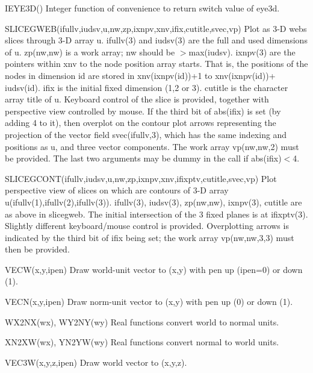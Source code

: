 IEYE3D() Integer function of convenience to return switch value of eye3d.



\iftth {}\fi


SLICEGWEB(ifullv,iudsv,u,nw,zp,ixnpv,xnv,ifix,cutitle,svec,vp) Plot
as 3-D webs slices through 3-D array u. ifullv(3) and iudsv(3) are the
full and used dimensions of u. zp(nw,nw) is a work array; nw should be
$>$max(iudsv). ixnpv(3) are the pointers within xnv to the node
position array starts. That is, the positions of the nodes in
dimension id are stored in xnv(ixnpv(id))+1 to xnv(ixnpv(id))+
iudsv(id). ifix is the initial fixed dimension (1,2 or 3). cutitle is
the character array title of u. Keyboard control of the slice is
provided, together with perspective view controlled by mouse. If the
third bit of abs(ifix) is set (by adding 4 to it), then overplot on
the contour plot arrows representing the projection of the vector
field svec(ifullv,3), which has the same indexing and positions as u,
and three vector components. The work array vp(nw,nw,2) must be
provided.  The last two arguments may be dummy in the call if
abs(ifix)$<$4.

\iftth {}\fi

SLICEGCONT(ifullv,iudsv,u,nw,zp,ixnpv,xnv,ifixptv,cutitle,svec,vp) Plot
perspective view of slices on which are contours of 3-D array
u(ifullv(1),ifullv(2),ifullv(3)). ifullv(3), iudsv(3), zp(nw,nw),
ixnpv(3), cutitle are as above in slicegweb. The initial intersection
of the 3 fixed planes is at ifixptv(3). Slightly different
keyboard/mouse control is provided. Overplotting arrows is indicated
by the third bit of ifix being set; the work array vp(nw,nw,3,3)
must then be provided.



VECW(x,y,ipen) Draw world-unit vector to (x,y) with pen up (ipen=0) or down (1).

VECN(x,y,ipen) Draw norm-unit vector to (x,y) with pen up (0) or down (1).

WX2NX(wx), WY2NY(wy) Real functions convert world to normal units.

XN2XW(wx), YN2YW(wy) Real functions convert normal to world units.

VEC3W(x,y,z,ipen) Draw world vector to (x,y,z).

